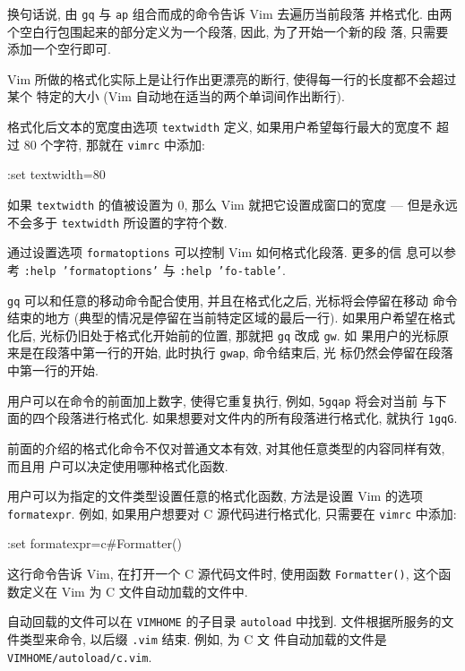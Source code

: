 换句话说, 由 \texttt{gq} 与 \texttt{ap} 组合而成的命令告诉 Vim 去遍历当前段落
并格式化. 由两个空白行包围起来的部分定义为一个段落, 因此, 为了开始一个新的段
落, 只需要添加一个空行即可.

Vim 所做的格式化实际上是让行作出更漂亮的断行, 使得每一行的长度都不会超过某个
特定的大小 (Vim 自动地在适当的两个单词间作出断行).

格式化后文本的宽度由选项 \texttt{textwidth} 定义, 如果用户希望每行最大的宽度不
超过 80 个字符, 那就在 \texttt{vimrc} 中添加:
\begin{vimcode}
:set textwidth=80
\end{vimcode}
如果 \texttt{textwidth} 的值被设置为 0, 那么 Vim 就把它设置成窗口的宽度 ---
但是永远不会多于 \texttt{textwidth} 所设置的字符个数.

\begin{warning}
    通过设置选项 \texttt{formatoptions} 可以控制 Vim 如何格式化段落. 更多的信
    息可以参考 \texttt{:help 'formatoptions'} 与 \texttt{:help 'fo-table'}.
\end{warning}

\texttt{gq} 可以和任意的移动命令配合使用, 并且在格式化之后, 光标将会停留在移动
命令结束的地方 (典型的情况是停留在当前特定区域的最后一行). 如果用户希望在格式
化后, 光标仍旧处于格式化开始前的位置, 那就把 \texttt{gq} 改成 \texttt{gw}. 如
果用户的光标原来是在段落中第一行的开始, 此时执行 \texttt{gwap}, 命令结束后, 光
标仍然会停留在段落中第一行的开始.

用户可以在命令的前面加上数字, 使得它重复执行, 例如, \texttt{5gqap} 将会对当前
与下面的四个段落进行格式化. 如果想要对文件内的所有段落进行格式化, 就执行
\texttt{1gqG}.

前面的介绍的格式化命令不仅对普通文本有效, 对其他任意类型的内容同样有效, 而且用
户可以决定使用哪种格式化函数.

用户可以为指定的文件类型设置任意的格式化函数, 方法是设置 Vim 的选项
\texttt{formatexpr}. 例如, 如果用户想要对 C 源代码进行格式化, 只需要在
\texttt{vimrc} 中添加:
\begin{vimcode}
:set formatexpr=c#Formatter()
\end{vimcode}
这行命令告诉 Vim, 在打开一个 C 源代码文件时, 使用函数 \texttt{Formatter()},
这个函数定义在 Vim 为 C 文件自动加载的文件中.

\begin{warning}
    自动回载的文件可以在 \texttt{VIMHOME} 的子目录 \texttt{autoload} 中找到.
    文件根据所服务的文件类型来命令, 以后缀 \texttt{.vim} 结束. 例如, 为 C 文
    件自动加载的文件是 \texttt{VIMHOME/autoload/c.vim}.
\end{warning}

